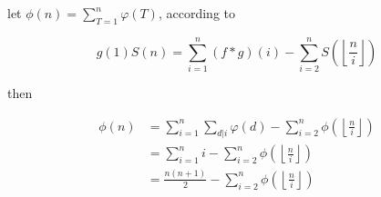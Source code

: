 let $\phi(n) = \sum\limits_{T=1}^{n} \varphi(T)$, according to

\begin{equation*}
	g(1)S(n) = \sum\limits_{i=1}^{n} (f \ast g)(i) - \sum\limits_{i=2}^{n} S\left(\left\lfloor \frac{n}{i} \right\rfloor \right)
\end{equation*}

then

\begin{equation*}
	\begin{aligned}
		\phi(n) 
		& = \sum\limits_{i=1}^{n} \sum\limits_{d|i} \varphi(d) - \sum\limits_{i=2}^{n} \phi \left(\left\lfloor \frac{n}{i} \right\rfloor \right) \\
		& = \sum\limits_{i=1}^{n} i - \sum\limits_{i=2}^{n} \phi \left(\left\lfloor \frac{n}{i} \right\rfloor \right) \\
		& = \frac{n(n + 1)}{2} - \sum\limits_{i=2}^{n} \phi \left(\left\lfloor \frac{n}{i} \right\rfloor \right)
	\end{aligned}
\end{equation*}


